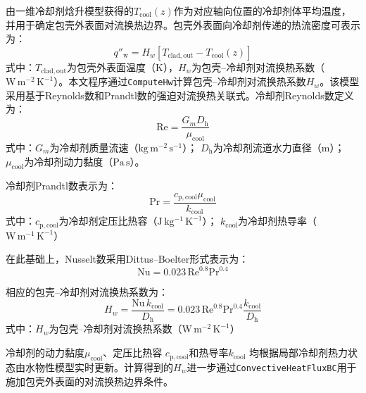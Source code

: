 \label{subsec:ch2_clad_coolant_bc}

由一维冷却剂{\rarecharfont 焓}升模型获得的$T_{\mathrm{cool}}(z)$作为对应轴向位置的冷却剂体平均温度，并用于确定包壳外表面对流换热边界。包壳外表面向冷却剂传递的热流密度可表示为：
\begin{equation}
	q''_{\mathrm w}
	=H_w
	\left[
	T_{\mathrm{clad,out}}-T_{\mathrm{cool}}(z)
	\right]
	\label{eq:ch2_clad_coolant_flux}
\end{equation}
\noindent 式中：$T_{\mathrm{clad,out}}$为包壳外表面温度（$\mathrm{K}$），$H_w$为包壳--冷却剂对流换热系数（$\mathrm{W\,m^{-2}\,K^{-1}}$）。本文程序通过\texttt{ComputeHw}计算包壳--冷却剂对流换热系数$H_w$。该模型采用基于Reynolds数和Prandtl数的强迫对流换热关联式。冷却剂Reynolds数定义为：
\begin{equation}
	\mathrm{Re}
	=
	\frac{G_m D_{\mathrm h}}{\mu_{\mathrm{cool}}}
	\label{eq:ch2_coolant_reynolds}
\end{equation}
\noindent 式中：$G_m$为冷却剂质量流速（$\mathrm{kg\,m^{-2}\,s^{-1}}$）；
$D_{\mathrm h}$为冷却剂流道水力直径（$\mathrm{m}$）；
$\mu_{\mathrm{cool}}$为冷却剂动力黏度（$\mathrm{Pa\,s}$）。

冷却剂Prandtl数表示为：
\begin{equation}
	\mathrm{Pr}
	=
	\frac{
		c_{\mathrm p,\mathrm{cool}}\mu_{\mathrm{cool}}
	}{
		k_{\mathrm{cool}}
	}
	\label{eq:ch2_coolant_prandtl}
\end{equation}
\noindent 式中：$c_{\mathrm p,\mathrm{cool}}$为冷却剂定压比热容（$\mathrm{J\,kg^{-1}\,K^{-1}}$）；
$k_{\mathrm{cool}}$为冷却剂热导率（$\mathrm{W\,m^{-1}\,K^{-1}}$）

在此基础上，Nusselt数采用Dittus--Boelter形式表示为：
\begin{equation}
	\mathrm{Nu}
	=
	0.023\,
	\mathrm{Re}^{0.8}
	\mathrm{Pr}^{0.4}
	\label{eq:ch2_coolant_nusselt}
\end{equation}

相应的包壳--冷却剂对流换热系数为：
\begin{equation}
	H_w
	=
	\frac{\mathrm{Nu}\,k_{\mathrm{cool}}}{D_{\mathrm h}}
	=
	0.023\,
	\mathrm{Re}^{0.8}
	\mathrm{Pr}^{0.4}
	\frac{k_{\mathrm{cool}}}{D_{\mathrm h}}
	\label{eq:ch2_coolant_hw}
\end{equation}
\noindent 式中：$H_w$为包壳--冷却剂对流换热系数（$\mathrm{W\,m^{-2}\,K^{-1}}$）

冷却剂的动力黏度$\mu_{\mathrm{cool}}$、定压比热容
$c_{\mathrm p,\mathrm{cool}}$和热导率$k_{\mathrm{cool}}$
均根据局部冷却剂热力状态由水物性模型实时更新。计算得到的$H_w$进一步通过\texttt{ConvectiveHeatFluxBC}用于施加包壳外表面的对流换热边界条件。

